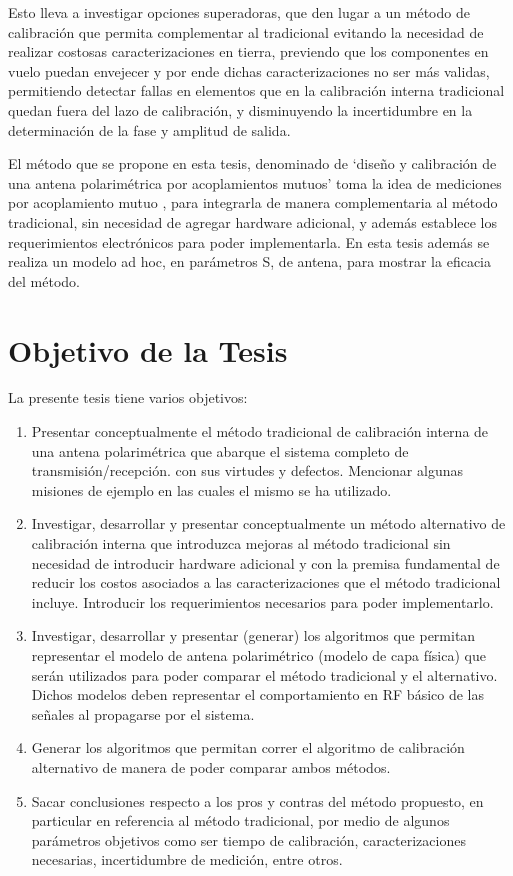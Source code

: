 Esto lleva a investigar opciones superadoras, que den lugar a un método de calibración que permita complementar al tradicional
evitando la necesidad de realizar costosas caracterizaciones en tierra, previendo que los componentes en vuelo puedan envejecer
y por ende dichas caracterizaciones no ser más validas, permitiendo detectar fallas en elementos que en la calibración interna
tradicional quedan fuera del lazo de calibración, y disminuyendo la incertidumbre en la determinación de la fase y amplitud de
salida.

El método que se propone en esta tesis, denominado de \enquote*{diseño y calibración de una antena polarimétrica por 
acoplamientos mutuos} toma la idea de mediciones por acoplamiento mutuo \cite{Agrawal2003}\cite{Shipley2000} \cite{Aumann1989}
\cite{Chen2012}, para integrarla de manera complementaria al método tradicional, sin necesidad de agregar hardware
adicional, y además establece los requerimientos electrónicos para poder implementarla. En esta tesis además se realiza un modelo
ad hoc, en parámetros S, de antena, para mostrar la eficacia del método.


\section{Objetivo de la Tesis} \label{sc:objective}

La presente tesis tiene varios objetivos:

\begin{enumerate}
    \item Presentar conceptualmente el método tradicional de calibración interna de una antena polarimétrica que abarque el
			sistema completo de transmisión/recepción. con sus virtudes y defectos. Mencionar algunas misiones de ejemplo en
			las cuales el mismo se ha utilizado.
    \item Investigar, desarrollar y presentar conceptualmente un método alternativo de calibración interna que introduzca
			mejoras al método tradicional sin necesidad de introducir hardware adicional y con la premisa fundamental de
			reducir los costos asociados a las caracterizaciones que el método tradicional incluye. Introducir los
			requerimientos necesarios para poder implementarlo.
    \item Investigar, desarrollar y presentar (generar) los algoritmos que permitan representar el modelo de antena
			polarimétrico (modelo de capa física) que serán utilizados para poder comparar el método tradicional y el
			alternativo. Dichos modelos deben representar el comportamiento en RF básico de las señales al propagarse por el
			sistema.
    \item Generar los algoritmos que permitan correr el algoritmo de calibración alternativo de manera de poder comparar ambos
			métodos.
    \item Sacar conclusiones respecto a los pros y contras del método propuesto, en particular en referencia al método
			tradicional, por medio de algunos parámetros objetivos como ser tiempo de calibración, caracterizaciones necesarias,
			incertidumbre de medición, entre otros.
\end{enumerate}



